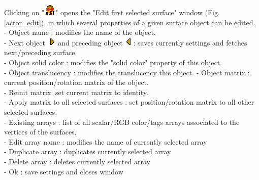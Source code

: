 Clicking on "\includegraphics[scale=0.7]{images/06/objects/actor_edit.png}" opens the "Edit first selected surface" window (Fig. \ref{actor_edit}), in which several properties of a given surface object can be edited.
\\
- Object name : modifies the name of the object.\\
- Next object \includegraphics[scale=0.7]{images/06/objects/s_right.png} and preceding object \includegraphics[scale=0.7]{images/06/objects/s_left.png}: saves currently  settings and fetches next/preceding surface.\\
- Object solid color : modifies the "solid color" property of this object.\\
- Object translucency : modifies the translucency this object.
- Object matrix : current position/rotation matrix of the object.\\
- Reinit matrix: set current matrix to identity.\\
- Apply matrix to all selected surfaces : set position/rotation matrix to all other selected surfaces.\\
- Existing arrays : list of all scalar/RGB color/tags arrays associated to the vertices of the surfaces.\\
- Edit array name : modifies the name of currently selected array\\
- Duplicate array : duplicates currently selected array\\
- Delete array : deletes currently selected array\\
- Ok : save settings and closes window



